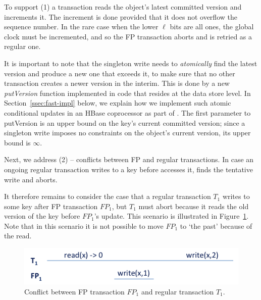 To support (1) a {} transaction reads the object's latest committed version and increments it. 
The increment is done provided that it does not overflow the sequence number. 
In the rare case when the lower $\ell$ bits are all ones, the global clock must be incremented, and so the FP transaction aborts and is retried as a regular one. 

It is important to note that the singleton write needs to \emph{atomically} find the latest version and produce a new one that exceeds it, 
to make sure that no other transaction creates a newer version in the interim. This is done by a new \emph{putVersion} function implemented in  code that resides at the data store level. In Section~\ref{ssec:fast-impl}
below, we explain how we implement such atomic conditional updates in an HBase {coprocessor} as part of \sys. 
The first parameter to putVersion is an upper bound on the key's current committed version; since a singleton write
imposes no constraints on the object's current version, its upper bound is $\infty$.

Next, we address (2) -- conflicts between FP and regular transactions.
In case an ongoing regular transaction writes to a key before  accesses it, 
 finds the tentative write and aborts. 

It therefore remains to consider the case that
a regular transaction $T_1$ writes to some key after FP transaction $FP_1$, but $T_1$ must abort because
it reads the old version of the key before $FP_1$'s update. This scenario is illustrated in Figure~\ref{fig:why-bump}. 
Note that in this scenario it is not possible to move $FP_1$ to `the past' because of the read.

\begin{figure}[htb]
\includegraphics[width=\columnwidth]{figs/FP-why-bump}
\caption{Conflict between FP transaction $FP_1$ and regular transaction $T_1$.}
\label{fig:why-bump}
\end{figure}

